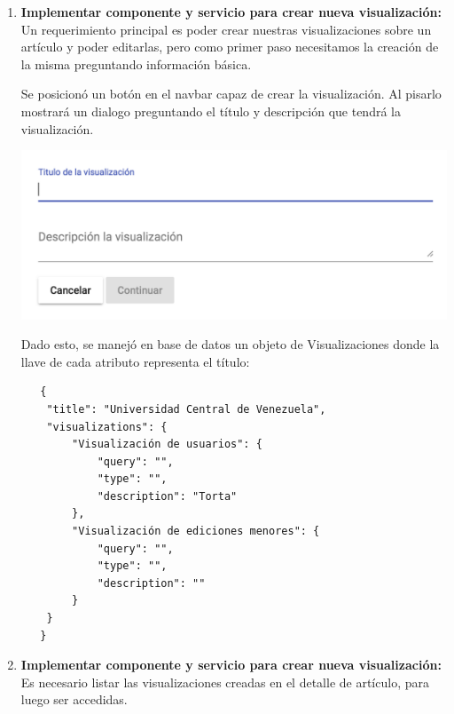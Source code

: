 \begin{enumerate}
  \item\textbf{Implementar componente y servicio para crear nueva visualización:}\\

  Un requerimiento principal es poder crear nuestras visualizaciones sobre un artículo y poder editarlas, pero como primer paso necesitamos la creación de la misma preguntando información básica.
  
 
  Se posicionó un botón en el navbar capaz de crear la visualización. Al pisarlo mostrará un dialogo preguntando el título y descripción que tendrá la visualización.

  \begin{center}
      \bigbreak
      \includegraphics[scale=0.55]{images/marco_aplicativo/create_vis_main.png}
      \label{fig:create_vis_main}
      \bigbreak
  \end{center}
  
  Dado esto, se manejó en base de datos un objeto de Visualizaciones donde la llave de cada atributo representa el título:

  \begin{verbatim}
   {
    "title": "Universidad Central de Venezuela",
    "visualizations": {
        "Visualización de usuarios": {
            "query": "",
            "type": "",
            "description": "Torta"
        },
        "Visualización de ediciones menores": {
            "query": "",
            "type": "",
            "description": ""
        }
    }
   }
  \end{verbatim}

  \item\textbf{Implementar componente y servicio para crear nueva visualización:}\\

  Es necesario listar las visualizaciones creadas en el detalle de artículo, para luego ser accedidas.
 

\end{enumerate}
